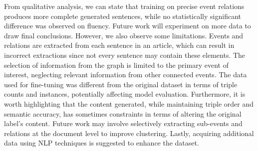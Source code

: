 \documentclass[
hf, %
]{ceurart}
\begin{document}
From qualitative analysis, we can state that training on precise event relations produces more complete generated sentences, while no statistically significant difference was observed on fluency. Future work will experiment on more data to draw final conclusions. However, we also observe some limitations. Events and relations are extracted from each sentence in an article, which can result in incorrect extractions since not every sentence may contain these elements. The selection of information from the graph is limited to the primary event of interest, neglecting relevant information from other connected events. The data used for fine-tuning was different from the original dataset in terms of triple counts and instances, potentially affecting model evaluation. Furthermore, it is worth highlighting that the content generated, while maintaining triple order and semantic accuracy, has sometimes constraints in terms of altering the original label's content. Future work may involve selectively extracting sub-events and relations at the document level to improve clustering. Lastly, acquiring additional data using NLP techniques is suggested to enhance the dataset.







\pagebreak


\appendix

\end{document}
